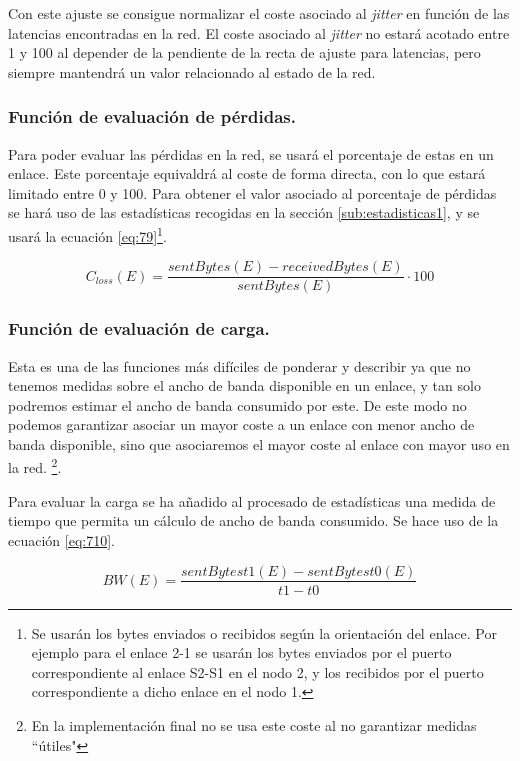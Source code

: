 \documentclass[a4paper,11pt]{book}
\begin{document}
Con este ajuste se consigue normalizar el coste asociado al \textit{jitter} en función de las latencias encontradas en la red. El coste asociado al \textit{jitter} no estará acotado entre 1 y 100 al depender de la pendiente de la recta de ajuste para latencias, pero siempre mantendrá un valor relacionado al estado de la red.

\subsubsection{Función de evaluación de pérdidas.} 

Para poder evaluar las pérdidas en la red, se usará el porcentaje de estas en un enlace. Este porcentaje equivaldrá al coste de forma directa, con lo que estará limitado entre 0 y 100. Para obtener el valor asociado al porcentaje de pérdidas se hará uso de las estadísticas recogidas en la sección \ref{sub:estadisticas1}, y se usará la ecuación \ref{eq:79}\footnote{Se usarán los bytes enviados o recibidos según la orientación del enlace. Por ejemplo para el enlace 2-1 se usarán los bytes enviados por el puerto correspondiente al enlace S2-S1 en el nodo 2, y los recibidos por el puerto correspondiente a dicho enlace en el nodo 1.}.

\begin{equation}\label{eq:79}
C_{loss}(E) = \frac{sentBytes(E) - receivedBytes(E)}{sentBytes(E)} \cdot 100
\end{equation}

\subsubsection{Función de evaluación de carga.}\label{sub:funcioncarga}

Esta es una de las funciones más difíciles de ponderar y describir ya que no tenemos medidas sobre el ancho de banda disponible en un enlace, y tan solo podremos estimar el ancho de banda consumido por este. De este modo no podemos garantizar asociar un mayor coste a un enlace con menor ancho de banda disponible, sino que asociaremos el mayor coste al enlace con mayor uso en la red. \footnote{En la implementación final no se usa este coste al no garantizar medidas ``útiles"}.

Para evaluar la carga se ha añadido al procesado de estadísticas una medida de tiempo que permita un cálculo de ancho de banda consumido. Se hace uso de la ecuación \ref{eq:710}.

\begin{equation}\label{eq:710}
BW(E) = \frac{sentBytest1(E)-sentBytest0(E)}{t1-t0}
\end{equation}
\end{document}
